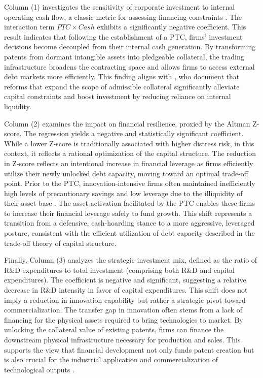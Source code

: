 \documentclass[12pt,a4paper]{article}
\begin{document}
Column (1) investigates the sensitivity of corporate investment to internal operating cash flow, a classic metric for assessing financing constraints \citep{fazzari1988financing,agca2017investmentca}. The interaction term $PTC \times Cash$ exhibits a significantly negative coefficient. This result indicates that following the establishment of a PTC, firms’ investment decisions become decoupled from their internal cash generation. By transforming patents from dormant intangible assets into pledgeable collateral, the trading infrastructure broadens the contracting space and allows firms to access external debt markets more efficiently. This finding aligns with \cite{campello2016enlarging}, who document that reforms that expand the scope of admissible collateral significantly alleviate capital constraints and boost investment by reducing reliance on internal liquidity.

Column (2) examines the impact on financial resilience, proxied by the Altman Z-score. The regression yields a negative and statistically significant coefficient. While a lower Z-score is traditionally associated with higher distress risk, in this context, it reflects a rational optimization of the capital structure. The reduction in Z-score reflects an intentional increase in financial leverage as firms efficiently utilize their newly unlocked debt capacity, moving toward an optimal trade-off point. Prior to the PTC, innovation-intensive firms often maintained inefficiently high levels of precautionary savings and low leverage due to the illiquidity of their asset base \citep{han2007corporate,lyandres2016cash,favara2021uncertainty}. The asset activation facilitated by the PTC enables these firms to increase their financial leverage safely to fund growth. This shift represents a transition from a defensive, cash-hoarding stance to a more aggressive, leveraged posture, consistent with the efficient utilization of debt capacity described in the trade-off theory of capital structure.

Finally, Column (3) analyzes the strategic investment mix, defined as the ratio of R\&D expenditures to total investment (comprising both R\&D and capital expenditures). The coefficient is negative and significant, suggesting a relative decrease in R\&D intensity in favor of capital expenditures. This shift does not imply a reduction in innovation capability but rather a strategic pivot toward commercialization. The transfer gap in innovation often stems from a lack of financing for the physical assets required to bring technologies to market. By unlocking the collateral value of existing patents, firms can finance the downstream physical infrastructure necessary for production and sales. This supports the view that financial development not only funds patent creation but is also crucial for the industrial application and commercialization of technological outputs \citep{hsu2014financial,santos2024sources_1dgfxe}.
\end{document}
